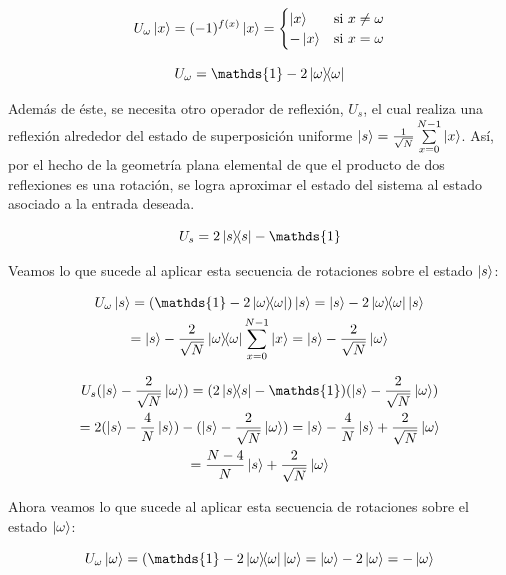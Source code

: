 \begin{equation}
    U_\omega \ket{x} = (-1)^{f(x)} \ket{x} =
    \begin{cases}
        \ket{x} & \text{si } x \neq \omega \\
        - \ket{x} & \text{si } x = \omega
    \end{cases}
\end{equation}

\begin{equation}
U_\omega = \mathds{1} - 2 \ketbra{\omega}{\omega}
\end{equation}

Además de éste, se necesita otro operador de reflexión, $U_s$, el cual realiza una reflexión alrededor del estado de superposición uniforme $\ket{s} = \frac{1}{\sqrt{N}} \sum\limits_{x=0}^{N-1} \ket{x}$. Así, por el hecho de la geometría plana elemental de que el producto de dos reflexiones es una rotación, se logra aproximar el estado del sistema al estado asociado a la entrada deseada.

\begin{equation}
U_s = 2 \ketbra{s}{s} - \mathds{1}
\end{equation}

Veamos lo que sucede al aplicar esta secuencia de rotaciones sobre el estado $\ket{s}$:

\begin{multline}
    U_\omega \ket{s}
    = (\mathds{1} - 2 \ketbra{\omega}{\omega}) \ket{s}
    = \ket{s} - 2 \ketbra{\omega}{\omega} \ket{s} \\
    = \ket{s} - \frac{2}{\sqrt{N}} \ketbra{\omega}{\omega} \sum\limits_{x=0}^{N-1} \ket{x}
    = \ket{s} - \frac{2}{\sqrt{N}} \ket{\omega}
\end{multline}

\begin{multline}
    U_s (\ket{s} - \frac{2}{\sqrt{N}} \ket{\omega})
    = (2 \ketbra{s}{s} - \mathds{1}) (\ket{s} - \frac{2}{\sqrt{N}} \ket{\omega}) \\
    = 2 (\ket{s} - \frac{4}{N} \ket{s}) - (\ket{s} - \frac{2}{\sqrt{N}} \ket{\omega})
    = \ket{s} - \frac{4}{N} \ket{s} + \frac{2}{\sqrt{N}} \ket{\omega} \\
    = \frac{N-4}{N} \ket{s} + \frac{2}{\sqrt{N}} \ket{\omega}
\end{multline}

Ahora veamos lo que sucede al aplicar esta secuencia de rotaciones sobre el estado $\ket{\omega}$:

\begin{equation}
    U_\omega \ket{\omega}
    = (\mathds{1} - 2 \ketbra{\omega}{\omega} \ket{\omega}
    = \ket{\omega} - 2 \ket{\omega}
    = - \ket{\omega}
\end{equation}

